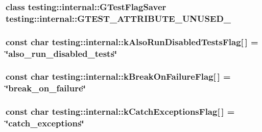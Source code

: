 \subsubsection[{G\+T\+E\+S\+T\+\_\+\+A\+T\+T\+R\+I\+B\+U\+T\+E\+\_\+\+U\+N\+U\+S\+E\+D\+\_\+}]{\setlength{\rightskip}{0pt plus 5cm}class {\bf testing\+::internal\+::\+G\+Test\+Flag\+Saver} testing\+::internal\+::\+G\+T\+E\+S\+T\+\_\+\+A\+T\+T\+R\+I\+B\+U\+T\+E\+\_\+\+U\+N\+U\+S\+E\+D\+\_\+}\label{namespacetesting_1_1internal_a581ac897511489c75a06aa328dcfb62f}
\hypertarget{namespacetesting_1_1internal_ad5882ed0ceadc0f23090f0f08b5d495b}{}
\subsubsection[{k\+Also\+Run\+Disabled\+Tests\+Flag}]{\setlength{\rightskip}{0pt plus 5cm}const char testing\+::internal\+::k\+Also\+Run\+Disabled\+Tests\+Flag\mbox{[}$\,$\mbox{]} = \char`\"{}also\+\_\+run\+\_\+disabled\+\_\+tests\char`\"{}}\label{namespacetesting_1_1internal_ad5882ed0ceadc0f23090f0f08b5d495b}
\hypertarget{namespacetesting_1_1internal_a804c907155bfee3a6616ae3ca04048d0}{}
\subsubsection[{k\+Break\+On\+Failure\+Flag}]{\setlength{\rightskip}{0pt plus 5cm}const char testing\+::internal\+::k\+Break\+On\+Failure\+Flag\mbox{[}$\,$\mbox{]} = \char`\"{}break\+\_\+on\+\_\+failure\char`\"{}}\label{namespacetesting_1_1internal_a804c907155bfee3a6616ae3ca04048d0}
\hypertarget{namespacetesting_1_1internal_af4bb309802e83df0927097e6e4201a38}{}
\subsubsection[{k\+Catch\+Exceptions\+Flag}]{\setlength{\rightskip}{0pt plus 5cm}const char testing\+::internal\+::k\+Catch\+Exceptions\+Flag\mbox{[}$\,$\mbox{]} = \char`\"{}catch\+\_\+exceptions\char`\"{}}\label{namespacetesting_1_1internal_af4bb309802e83df0927097e6e4201a38}
\hypertarget{namespacetesting_1_1internal_a884ff13b75232fbe7daa0caf46f1de66}{}
